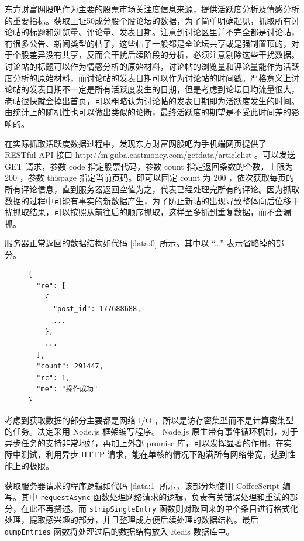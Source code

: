 东方财富网股吧作为主要的股票市场关注度信息来源，提供活跃度分析及情感分析的重要指标。获取上证50成分股个股论坛的数据，为了简单明确起见，抓取所有讨论帖的标题和浏览量、评论量、发表日期。注意到讨论区里并不完全都是讨论帖，有很多公告、新闻类型的帖子，这些帖子一般都是全论坛共享或是强制置顶的，对于个股差异没有共享，反而会干扰后续阶段的分析，必须注意剔除这些干扰数据。讨论帖的标题可以作为情感分析的原始材料，讨论帖的浏览量和评论量能作为活跃度分析的原始材料，而讨论帖的发表日期可以作为讨论帖的时间戳。严格意义上讨论帖的发表日期不一定是所有活跃度发生的日期，但是考虑到论坛日均流量很大，老帖很快就会掉出首页，可以粗略认为讨论帖的发表日期即为活跃度发生的时间。由统计上的随机性也可以做出类似的论断，最终活跃度的期望是不受此时间差的影响的。

在实际抓取活跃度数据过程中，发现东方财富网股吧为手机端网页提供了 RESTful API 接口 http://m.guba.eastmoney.com/getdata/articlelist 。可以发送 GET 请求，参数 code 指定股票代码，参数 count 指定返回条数的个数，上限为 200 ，参数 thispage 指定当前页码。即可以固定 count 为 200 ，依次获取每页的所有评论信息，直到服务器返回空值为之，代表已经处理完所有的评论。因为抓取数据的过程中可能有事实的新数据产生，为了防止新帖的出现导致整体向后位移干扰抓取结果，可以按照从前往后的顺序抓取，这样至多抓到重复数据，而不会漏抓。

服务器正常返回的数据结构如代码 \ref{data:0} 所示。其中以 ``...'' 表示省略掉的部分。

\begin{figure}
  \begin{minipage}{\textwidth}
    \begin{lstlisting}[caption=API 返回结果, label=data:0]
{
  "re": [
    {
      "post_id": 177688688,
      ...
    },
    ...
  ],
  "count": 291447,
  "rc": 1,
  "me": "操作成功"
}
    \end{lstlisting}
  \end{minipage}
\end{figure}

考虑到获取数据的部分主要都是网络 I/O ，所以是访存密集型而不是计算密集型的任务。决定采用 Node.js 框架编写程序。 Node.js 原生带有事件循环机制，对于异步任务的支持非常地好，再加上外部 promise 库，可以发挥显著的作用。在实际中测试，利用异步 HTTP 请求，能在单核的情况下跑满所有网络带宽，达到性能上的极限。

获取服务器请求的程序逻辑如代码 \ref{data:1} 所示，该部分均使用 CoffeeScript 编写。其中 \texttt{requestAsync} 函数处理网络请求的逻辑，负责有关错误处理和重试的部分，在此不再赘述。而 \texttt{stripSingleEntry} 函数则对取回来的单个条目进行格式化处理，提取感兴趣的部分，并且整理成方便后续处理的数据结构。最后 \texttt{dumpEntries} 函数将处理过后的数据结构放入 Redis 数据库中。

